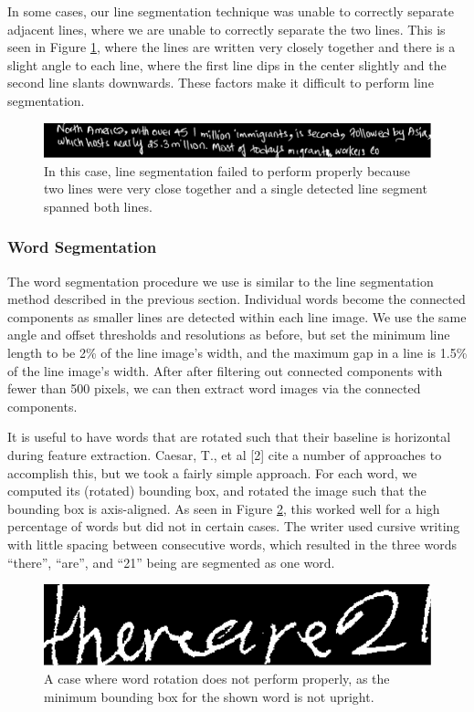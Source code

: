 \documentclass[paper=a4, fontsize=11pt]{scrartcl} %
\numberwithin{equation}{section} %
\numberwithin{figure}{section} %
\numberwithin{table}{section} %
\begin{document}
In some cases, our line segmentation technique was unable to correctly separate adjacent lines, where we are unable to correctly separate the two lines. This is seen in Figure \ref{fig:linefail}, where the lines are written very closely together and there is a slight angle to each line, where the first line dips in the center slightly and the second line slants downwards. These factors make it difficult to perform line segmentation.

\begin{figure}
\includegraphics{linefail.png}
\caption{In this case, line segmentation failed to perform properly because two lines were very close together and a single detected line segment spanned both lines.}
\label{fig:linefail}
\end{figure}

\subsubsection{Word Segmentation}
The word segmentation procedure we use is similar to the line
segmentation method described in the previous section. Individual words become the connected components as smaller lines are detected within each line image. We use the same angle and offset thresholds and resolutions as before, but set the minimum line length  to be 2\% of the line image's width,
and the maximum gap in a line is 1.5\% of the line image's
width. After after filtering out connected components with fewer than
500 pixels, we can then extract word images via the connected
components.

It is useful to have words that are rotated such that their baseline is horizontal during feature extraction. Caesar, T., et al [2] cite a number of approaches to accomplish this, but we took a fairly simple approach. For each word, we computed its (rotated) bounding box, and rotated the image such that the bounding box is axis-aligned. As seen in Figure \ref{fig:wordfail}, this worked well for a high percentage of words but did not in certain cases. The writer used cursive writing with little spacing between consecutive words, which resulted in the three words “there”, “are”, and “21” being are segmented as one word.

\begin{figure}
  \includegraphics{wordfail.png}
  \caption{A case where word rotation does not perform properly, as
    the minimum bounding box for the shown word is not upright.}
  \label{fig:wordfail}
\end{figure}
\end{document}
